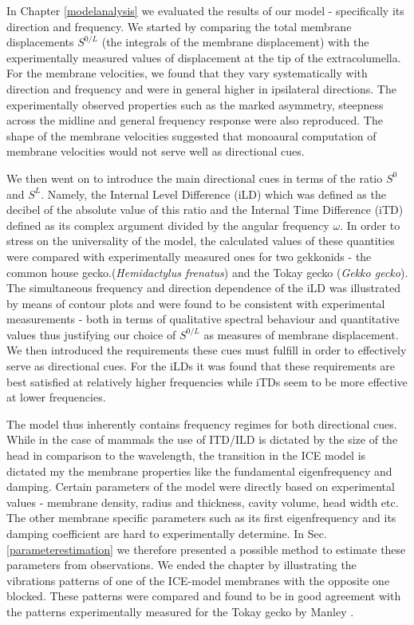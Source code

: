 In Chapter \ref{modelanalysis} we evaluated the results of our model - specifically its direction and frequency. We started
by comparing the total membrane displacements $S^{0/L}$ (the integrals of the membrane displacement) with the experimentally 
measured values of displacement at the tip of the extracolumella. 
For the membrane velocities, we found that they vary systematically with
direction and frequency and were in general higher in ipsilateral directions. The experimentally observed properties such
as the marked asymmetry, steepness across the midline and general frequency response were also reproduced. The shape of the membrane
velocities suggested that monoaural computation of membrane velocities would not serve well as directional cues.

We then went on to introduce the main directional cues in terms of the ratio $S^{0}$ and $S^{L}$. Namely, the Internal Level Difference
(iLD) which was defined as the decibel of the absolute value of this ratio and the Internal Time Difference (iTD) defined as its complex
argument divided by the angular frequency $\omega$. In order to stress on the universality of the model, the calculated values of these
 quantities were compared with experimentally measured ones for two gekkonids - the common house gecko.(\emph{Hemidactylus frenatus}) and the Tokay gecko
 (\emph{Gekko gecko}). The simultaneous frequency and direction dependence of the iLD was illustrated by
means of contour plots and were found to be consistent with experimental measurements - both in terms of qualitative spectral behaviour and
quantitative values thus justifying our choice of $S^{0/L}$ as measures of membrane displacement. We then introduced the requirements these cues must fulfill in order to effectively serve as
directional cues. For the iLDs it was found that these requirements are best satisfied at relatively higher frequencies while
 iTDs seem to be more effective at lower frequencies.
 
The model thus inherently contains frequency regimes for both directional cues. While in the case of mammals the use of ITD/ILD
is dictated by the size of the head in comparison to the wavelength, the transition in the ICE model is dictated my the membrane
properties like the fundamental eigenfrequency and damping. Certain parameters of the model were directly based on experimental
values - membrane density, radius and thickness, cavity volume, head width etc. The other membrane specific parameters such
as its first eigenfrequency and its damping coefficient are hard to experimentally determine. In Sec. \ref{parameterestimation} we therefore presented
a possible method to estimate these parameters from observations. We ended the chapter by illustrating the vibrations patterns of one of the ICE-model
membranes with the opposite one blocked. These patterns were compared and found to be in good agreement with the patterns experimentally measured for the Tokay gecko by Manley \cite{manleygecko1}.


